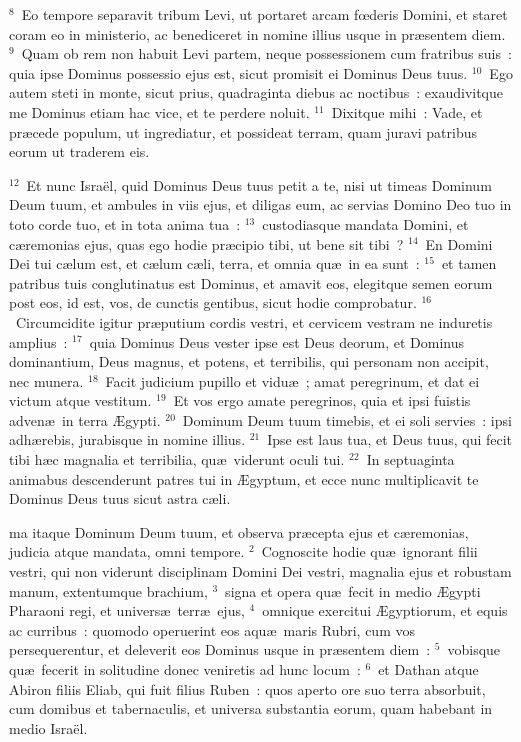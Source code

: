${}^{8}$~Eo tempore separavit tribum Levi, ut portaret arcam fœderis Domini, et staret coram eo in ministerio, ac benediceret in nomine illius usque in pr\ae sentem diem.
${}^{9}$~Quam ob rem non habuit Levi partem, neque possessionem cum fratribus suis~: quia ipse Dominus possessio ejus est, sicut promisit ei Dominus Deus tuus.
${}^{10}$~Ego autem steti in monte, sicut prius, quadraginta diebus ac noctibus~: exaudivitque me Dominus etiam hac vice, et te perdere noluit.
${}^{11}$~Dixitque mihi~: Vade, et pr\ae cede populum, ut ingrediatur, et possideat terram, quam juravi patribus eorum ut traderem eis.


${}^{12}$~Et nunc Isra\"el, quid Dominus Deus tuus petit a te, nisi ut timeas Dominum Deum tuum, et ambules in viis ejus, et diligas eum, ac servias Domino Deo tuo in toto corde tuo, et in tota anima tua~:
${}^{13}$~custodiasque mandata Domini, et c\ae remonias ejus, quas ego hodie pr\ae cipio tibi, ut bene sit tibi~?
${}^{14}$~En Domini Dei tui c\ae lum est, et c\ae lum c\ae li, terra, et omnia qu\ae\ in ea sunt~:
${}^{15}$~et tamen patribus tuis conglutinatus est Dominus, et amavit eos, elegitque semen eorum post eos, id est, vos, de cunctis gentibus, sicut hodie comprobatur.
${}^{16}$~Circumcidite igitur pr\ae putium cordis vestri, et cervicem vestram ne induretis amplius~:
${}^{17}$~quia Dominus Deus vester ipse est Deus deorum, et Dominus dominantium, Deus magnus, et potens, et terribilis, qui personam non accipit, nec munera.
${}^{18}$~Facit judicium pupillo et vidu\ae~; amat peregrinum, et dat ei victum atque vestitum.
${}^{19}$~Et vos ergo amate peregrinos, quia et ipsi fuistis adven\ae\ in terra \AE gypti.
${}^{20}$~Dominum Deum tuum timebis, et ei soli servies~: ipsi adh\ae rebis, jurabisque in nomine illius.
${}^{21}$~Ipse est laus tua, et Deus tuus, qui fecit tibi h\ae c magnalia et terribilia, qu\ae\ viderunt oculi tui.
${}^{22}$~In septuaginta animabus descenderunt patres tui in \AE gyptum, et ecce nunc multiplicavit te Dominus Deus tuus sicut astra c\ae li.

\bchapter
{}ma itaque Dominum Deum tuum, et observa pr\ae cepta ejus et c\ae remonias, judicia atque mandata, omni tempore.
${}^{2}$~Cognoscite hodie qu\ae\ ignorant filii vestri, qui non viderunt disciplinam Domini Dei vestri, magnalia ejus et robustam manum, extentumque brachium,
${}^{3}$~signa et opera qu\ae\ fecit in medio \AE gypti Pharaoni regi, et univers\ae\ terr\ae\ ejus,
${}^{4}$~omnique exercitui \AE gyptiorum, et equis ac curribus~: quomodo operuerint eos aqu\ae\ maris Rubri, cum vos persequerentur, et deleverit eos Dominus usque in pr\ae sentem diem~:
${}^{5}$~vobisque qu\ae\ fecerit in solitudine donec veniretis ad hunc locum~:
${}^{6}$~et Dathan atque Abiron filiis Eliab, qui fuit filius Ruben~: quos aperto ore suo terra absorbuit, cum domibus et tabernaculis, et universa substantia eorum, quam habebant in medio Isra\"el.


